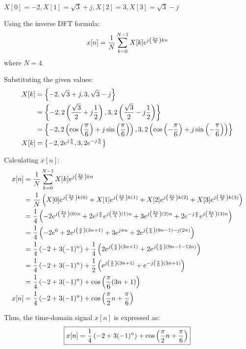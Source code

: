 \documentclass[a4paper, 10pt]{article}
\begin{document}
\newpage

\begin{tosubmit}
\begin{subsubproblems}[start=2]
    \item \( X[0] = -2, X[1] = \sqrt{3} + j, X[2] = 3, X[3] = \sqrt{3} - j \)
\end{subsubproblems}

\par\noindent\submitsolution
Using the inverse DFT formula:
\[ x[n] = \frac{1}{N} \sum_{k=0}^{N-1} X[k] e^{j \left( \frac{2\pi}{N} \right) kn} \]
where \( N = 4 \).

\vspace{2mm}

Substituting the given values:
\begin{align*}
    X[k] &= \left\{ -2, \sqrt{3} + j, 3, \sqrt{3} - j \right\} \\
    &= \left\{ -2, 2 \left( \frac{\sqrt{3}}{2} + j \frac{1}{2} \right), 3, 2 \left( \frac{\sqrt{3}}{2} - j \frac{1}{2} \right) \right\} \\
    &= \left\{ -2, 2 \left( \cos{ \left( \frac{\pi}{6} \right) } + j \sin{ \left( \frac{\pi}{6} \right) } \right), 3, 2 \left( \cos{ \left( -\frac{\pi}{6} \right) } + j \sin{ \left( -\frac{\pi}{6} \right) } \right) \right\} \\
    X[k] &= \left\{ -2, 2 e^{j\frac{\pi}{6}}, 3, 2 e^{-j\frac{\pi}{6}} \right\}
\end{align*}

Calculating \( x[n] \):
\begin{align*}
    x[n] &= \frac{1}{N} \sum_{k=0}^{N-1} X[k] e^{j \left( \frac{2\pi}{N} \right) kn} \\
    &= \frac{1}{N} \left( X[0] e^{j \left( \frac{2\pi}{N} \right) k(0)} + X[1] e^{j \left( \frac{2\pi}{N} \right) k(1)} + X[2] e^{j \left( \frac{2\pi}{N} \right) k(2)} + X[3] e^{j \left( \frac{2\pi}{N} \right) k(3)} \right) \\
    &= \frac{1}{4} \left( -2 e^{j \left( \frac{2\pi}{4} \right) ( 0 ) n} + 2 e^{j\frac{\pi}{6}} e^{j \left( \frac{2\pi}{4} \right) ( 1 ) n} + 3 e^{j \left( \frac{2\pi}{4} \right) ( 2 ) n} + 2 e^{-j\frac{\pi}{6}} e^{j \left( \frac{2\pi}{4} \right) ( 3 ) n} \right) \\
    &= \frac{1}{4} \left( -2 e^{ 0 } + 2 e^{j \left( \frac{\pi}{6} \right) (3n + 1)} + 3 e^{j \pi n} + 2 e^{j \left( \frac{\pi}{6} \right) (9n - 1) - j ( 2 \pi )} \right) \\
    &= \frac{1}{4} \left( -2 + 3(-1)^n \right) + \frac{1}{4} \left( 2 e^{j \left( \frac{\pi}{6} \right) (3n + 1)} + 2 e^{j \left( \frac{\pi}{6} \right) (9n - 1 - 12n)} \right) \\
    &= \frac{1}{4} \left( -2 + 3(-1)^n \right) + \frac{1}{2} \left( e^{j \left( \frac{\pi}{6} \right) (3n + 1)} + e^{-j \left( \frac{\pi}{6} \right) (3n + 1)} \right) \\
    &= \frac{1}{4} \left( -2 + 3(-1)^n \right) + \cos{\left( \frac{\pi}{6} (3n + 1)\right) } \\
    x[n] &= \frac{1}{4} \left( -2 + 3(-1)^n \right) + \cos{\left( \frac{\pi}{2} n + \frac{\pi}{6}\right) }
\end{align*}

Thus, the time-domain signal \( x[n] \) is expressed as:
\[ \boxed{ x[n] = \frac{1}{4} \left( -2 + 3(-1)^n \right) + \cos{\left( \frac{\pi}{2} n + \frac{\pi}{6}\right) } } \]
\end{tosubmit}
\end{document}
